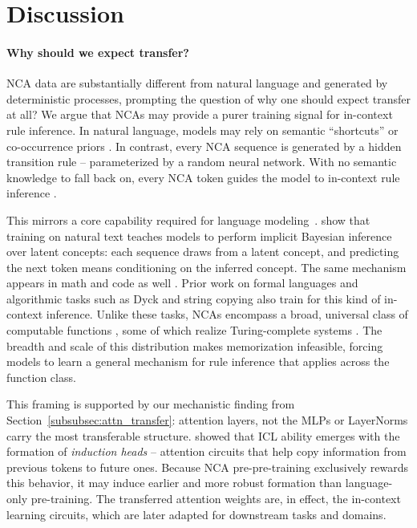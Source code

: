 \documentclass{article}
\theoremstyle{plain}
\theoremstyle{definition}
\theoremstyle{remark}
\begin{document}
\section{Discussion}
\label{sec:discussion}

\paragraph{Why should we expect transfer?}
NCA data are substantially different from natural language and generated by deterministic processes, prompting the question of why one should expect transfer at all? We argue that NCAs may provide a purer training signal for in-context rule inference. In natural language, models may rely on semantic ``shortcuts'' or co-occurrence priors \citep{abbas2023semdedupdataefficientlearningwebscale, geirhos2020shortcut}. 
In contrast, every NCA sequence is generated by a hidden transition rule -- parameterized by a random neural network. With no semantic knowledge to fall back on, every NCA token guides the model to in-context rule inference \citep{kirsch2022general}.

This mirrors a core capability required for language modeling~\citep{brown2020language, wei2022emergentabilitieslargelanguage, dong2024survey}. \citet{xie2022explanationincontextlearningimplicit} show that training on natural text teaches models to perform implicit Bayesian inference over latent concepts: each sequence draws from a latent concept, and predicting the next token means conditioning on the inferred concept. The same mechanism appears in math and code as well \citep{garg2023transformerslearnincontextcase, cook2025programming}. Prior work on formal languages and algorithmic tasks such as Dyck and string copying \citep{hu2025circuitschomskyprepretrainingformal, wu2022insightspretrainingsimplersynthetic,shinnick2025learnimagesproceduralwarmup} also train for this kind of in-context inference. Unlike these tasks, NCAs encompass a broad, universal class of computable functions \citep{Copeland2012}, some of which realize Turing-complete systems \citep{Rendell2002, wolfram2003new}.
The breadth and scale of this distribution makes memorization infeasible, forcing models to learn a general mechanism for rule inference \citep{li2024languagemodelslearncontext} that applies across the function class.

This framing is supported by our mechanistic finding from Section~\ref{subsubsec:attn_transfer}: attention layers, not the MLPs or LayerNorms carry the most transferable structure. \citep{olsson2022context} showed that ICL ability emerges with the formation of \textit{induction heads} -- attention circuits that help copy information from previous tokens to future ones. Because NCA pre-pre-training exclusively rewards this behavior, it may induce earlier and more robust formation than language-only pre-training. The transferred attention weights are, in effect, the in-context learning circuits, which are later adapted for downstream tasks and domains.
\end{document}
